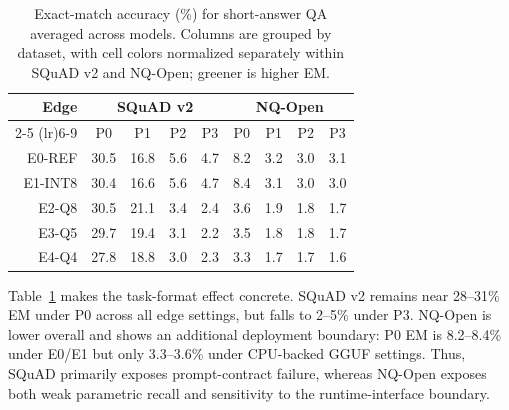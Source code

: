 \documentclass[letterpaper]{article} %
\begin{document}
\begin{table}[t]
\centering
\caption{Exact-match accuracy (\%) for short-answer QA averaged across models.
Columns are grouped by dataset, with cell colors normalized separately within
SQuAD v2 and NQ-Open; greener is higher EM.}
\label{tab:short-answer-edge-prompt-em}
\setlength{\tabcolsep}{2.4pt}
\renewcommand{\arraystretch}{0.92}
\begin{tabular}{rcccc|cccc}
\toprule
Edge & \multicolumn{4}{c}{SQuAD v2} & \multicolumn{4}{c}{NQ-Open} \\
\cmidrule(lr){2-5} \cmidrule(lr){6-9}
 & P0 & P1 & P2 & P3 & P0 & P1 & P2 & P3 \\
\midrule
E0-REF & \cellcolor[HTML]{D9EAD3}30.5 & \cellcolor[HTML]{FEF2CC}16.8 & \cellcolor[HTML]{F7D5CC}5.6 & \cellcolor[HTML]{F6D3CC}4.7 & \cellcolor[HTML]{DBEAD3}8.2 & \cellcolor[HTML]{F9DECC}3.2 & \cellcolor[HTML]{F9DCCC}3.0 & \cellcolor[HTML]{F9DDCC}3.1 \\
E1-INT8 & \cellcolor[HTML]{D9EAD3}30.4 & \cellcolor[HTML]{FEF2CC}16.6 & \cellcolor[HTML]{F7D5CC}5.6 & \cellcolor[HTML]{F6D3CC}4.7 & \cellcolor[HTML]{D9EAD3}8.4 & \cellcolor[HTML]{F9DDCC}3.1 & \cellcolor[HTML]{F8DBCC}3.0 & \cellcolor[HTML]{F8DCCC}3.0 \\
E2-Q8 & \cellcolor[HTML]{D9EAD3}30.5 & \cellcolor[HTML]{F2EFCE}21.1 & \cellcolor[HTML]{F5CFCC}3.4 & \cellcolor[HTML]{F4CDCC}2.4 & \cellcolor[HTML]{FBE3CC}3.6 & \cellcolor[HTML]{F5CFCC}1.9 & \cellcolor[HTML]{F5CFCC}1.8 & \cellcolor[HTML]{F4CDCC}1.7 \\
E3-Q5 & \cellcolor[HTML]{DBEAD3}29.7 & \cellcolor[HTML]{F7F0CE}19.4 & \cellcolor[HTML]{F5CECC}3.1 & \cellcolor[HTML]{F4CCCC}2.2 & \cellcolor[HTML]{FAE2CC}3.5 & \cellcolor[HTML]{F5CECC}1.8 & \cellcolor[HTML]{F4CECC}1.8 & \cellcolor[HTML]{F4CDCC}1.7 \\
E4-Q4 & \cellcolor[HTML]{E0ECD2}27.8 & \cellcolor[HTML]{F8F1CD}18.8 & \cellcolor[HTML]{F5CECC}3.0 & \cellcolor[HTML]{F4CCCC}2.3 & \cellcolor[HTML]{F9DFCC}3.3 & \cellcolor[HTML]{F4CDCC}1.7 & \cellcolor[HTML]{F4CDCC}1.7 & \cellcolor[HTML]{F4CCCC}1.6 \\
\bottomrule
\end{tabular}%
\end{table}

Table~\ref{tab:short-answer-edge-prompt-em} makes the task-format effect
concrete. SQuAD v2 remains near 28--31\% EM under P0 across all edge settings,
but falls to 2--5\% under P3. NQ-Open is lower overall and shows an additional
deployment boundary: P0 EM is 8.2--8.4\% under E0/E1 but only 3.3--3.6\% under
CPU-backed GGUF settings. Thus, SQuAD primarily exposes prompt-contract
failure, whereas NQ-Open exposes both weak parametric recall and sensitivity to
the runtime-interface boundary.
\end{document}

